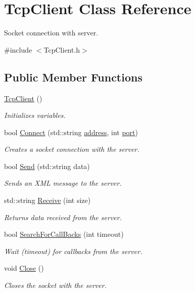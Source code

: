\hypertarget{classTcpClient}{\section{Tcp\-Client Class Reference}
\label{classTcpClient}
}


Socket connection with server.  




{\ttfamily \#include $<$Tcp\-Client.\-h$>$}

\subsection*{Public Member Functions}
\begin{DoxyCompactItemize}
\item 
\hyperlink{classTcpClient_ad2e6b99a63964caa825c44e93ff8e777}{Tcp\-Client} ()
\begin{DoxyCompactList}\small\item\em Initializes variables. \end{DoxyCompactList}\item 
bool \hyperlink{classTcpClient_ac2e9bb63b4e0dc8f4508aa2a85431fe2}{Connect} (std\-::string \hyperlink{classTcpClient_a8bcb24ebf1d8e22e9185f3056fd108c4}{address}, int \hyperlink{classTcpClient_aa112ef0470437e790931b3ec9c98a800}{port})
\begin{DoxyCompactList}\small\item\em Creates a socket connection with the server. \end{DoxyCompactList}\item 
bool \hyperlink{classTcpClient_acac6ca70c9d99e09731181e5239381ae}{Send} (std\-::string data)
\begin{DoxyCompactList}\small\item\em Sends an X\-M\-L message to the server. \end{DoxyCompactList}\item 
std\-::string \hyperlink{classTcpClient_aa000d653ba13fb447642e81890cdc866}{Receive} (int size)
\begin{DoxyCompactList}\small\item\em Returns data received from the server. \end{DoxyCompactList}\item 
bool \hyperlink{classTcpClient_a4df900657b1cb45aced143fe21a81937}{Search\-For\-Call\-Backs} (int timeout)
\begin{DoxyCompactList}\small\item\em Wait (timeout) for callbacks from the server. \end{DoxyCompactList}\item 
void \hyperlink{classTcpClient_ae7a96d69db612ef4827ee23c31332a4e}{Close} ()
\begin{DoxyCompactList}\small\item\em Closes the socket with the server. \end{DoxyCompactList}\end{DoxyCompactItemize}
